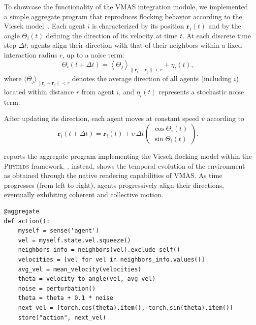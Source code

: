 \documentclass[runningheads]{llncs}
\begin{document}
To showcase the functionality of the VMAS integration module, 
 we implemented a simple aggregate program that reproduces 
 flocking behavior according to the Vicsek model~\cite{vicsek1995novel}. 
% 
Each agent $i$ is characterized by its position $\mathbf{r}_i(t)$ 
 and by the angle $\Theta_i(t)$ defining the direction of its velocity at time $t$. 
%
At each discrete time step $\Delta t$, 
 agents align their direction with that of their neighbors within a fixed interaction radius $r$, 
 up to a noise term:
\begin{equation}
\Theta_i(t+\Delta t)
=
\left\langle \Theta_j \right\rangle_{\lVert \mathbf{r}_i-\mathbf{r}_j\rVert < r}
+
\eta_i(t),
\end{equation}
where $\langle \Theta_j \rangle_{\lVert \mathbf{r}_i-\mathbf{r}_j\rVert < r}$ denotes 
 the average direction of all agents (including $i$) located within distance $r$ from agent $i$, 
 and $\eta_i(t)$ represents a stochastic noise term.

After updating its direction, each agent moves at constant speed $v$ according to
\begin{equation}
\mathbf{r}_i(t+\Delta t)
=
\mathbf{r}_i(t)
+
v\,\Delta t
\begin{pmatrix}
\cos \Theta_i(t)\\
\sin \Theta_i(t)
\end{pmatrix}.
\end{equation}

 reports the aggregate program 
 implementing the Vicsek flocking model within the \textsc{Phyelds} framework. 
%
, instead, 
 shows the temporal evolution of the environment as obtained through 
 the native rendering capabilities of VMAS.
% 
As time progresses (from left to right), 
 agents progressively align their directions, 
 eventually exhibiting coherent and collective motion.


\begin{lstlisting}[style=pythonstyle, caption={Implementation of the Vicsek Model in Phyelds using VMAS.}, label={lst:flocking}]
@aggregate
def action():
    myself = sense('agent')
    vel = myself.state.vel.squeeze()
    neighbors_info = neighbors(vel).exclude_self()
    velocities = [vel for vel in neighbors_info.values()]
    avg_vel = mean_velocity(velocities)
    theta = velocity_to_angle(vel, avg_vel)
    noise = perturbation()
    theta = theta + 0.1 * noise
    next_vel = [torch.cos(theta).item(), torch.sin(theta).item()]
    store("action", next_vel)
\end{lstlisting}
\end{document}
